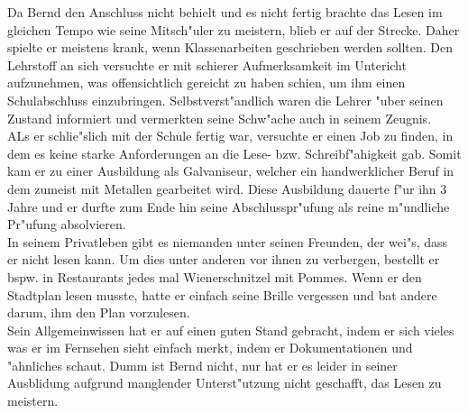 Da Bernd den Anschluss nicht behielt und es nicht fertig brachte das Lesen im gleichen Tempo wie seine Mitsch"uler zu meistern, blieb er auf der Strecke. Daher spielte er meistens krank, wenn Klassenarbeiten geschrieben werden sollten. Den Lehrstoff an sich versuchte er mit schierer Aufmerksamkeit im Untericht aufzunehmen, was offensichtlich gereicht zu haben schien, um ihm einen Schulabschluss einzubringen. Selbstverst"andlich waren die Lehrer "uber seinen Zustand informiert und vermerkten seine Schw"ache auch in seinem Zeugnis.\\

 ALs er schlie"slich mit der Schule fertig war, versuchte er einen Job zu finden, in dem es keine starke Anforderungen an die Lese- bzw. Schreibf"ahigkeit gab. Somit kam er zu einer Ausbildung als Galvaniseur, welcher ein handwerklicher Beruf in dem zumeist mit Metallen gearbeitet wird. Diese Ausbildung dauerte f"ur ihn 3 Jahre und er durfte zum Ende hin seine Abschlusspr"ufung als reine m"undliche Pr"ufung absolvieren.\\

In seinem Privatleben gibt es niemanden unter seinen Freunden, der wei"s, dass er nicht lesen kann. Um dies unter anderen vor ihnen zu verbergen, bestellt er bspw. in Restaurants jedes mal Wienerschnitzel mit Pommes. Wenn er den Stadtplan lesen musste, hatte er einfach seine Brille vergessen und bat andere darum, ihm den Plan vorzulesen.\\

Sein Allgemeinwissen hat er auf einen guten Stand gebracht, indem er sich vieles was er im Fernsehen sieht einfach merkt, indem er Dokumentationen und "ahnliches schaut. Dumm ist Bernd nicht, nur hat er es leider in seiner Ausblidung aufgrund manglender Unterst"utzung nicht geschafft, das Lesen zu meistern.

